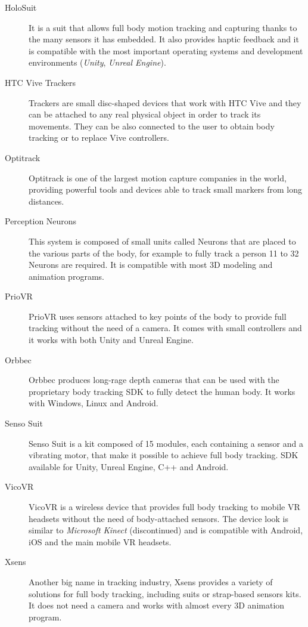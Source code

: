 \documentclass[binding=0.6cm,LaM]{sapthesis}
\begin{document}
\begin{description}

\item[HoloSuit]
It is a suit that allows full body motion tracking and capturing thanks to the many sensors it has embedded. It also provides haptic feedback and it is compatible with the most important operating systems and development environments (\textit{Unity}, \textit{Unreal Engine}).

\item[HTC Vive Trackers]
Trackers are small disc-shaped devices that work with HTC Vive and they can be attached to any real physical object in order to track its movements. They can be also connected to the user to obtain body tracking or to replace Vive controllers.

\item[Optitrack]
Optitrack is one of the largest motion capture companies in the world, providing powerful tools and devices able to track small markers from long distances.

\item[Perception Neurons]
This system is composed of small units called Neurons that are placed to the various parts of the body, for example to fully track a person 11 to 32 Neurons are required. It is compatible with most 3D modeling and animation programs.

\item[PrioVR]
PrioVR uses sensors attached to key points of the body to provide full tracking without the need of a camera. It comes with small controllers and it works with both Unity and Unreal Engine.

\item[Orbbec]
Orbbec produces long-rage depth cameras that can be used with the proprietary body tracking SDK to fully detect the human body. It works with Windows, Linux and Android.

\item[Senso Suit]
Senso Suit is a kit composed of 15 modules, each containing a sensor and a vibrating motor, that make it possible to achieve full body tracking.  SDK available for Unity, Unreal Engine, C++ and Android. 

\item[VicoVR]
VicoVR is a wireless device that provides full body tracking to mobile VR headsets without the need of body-attached sensors. The device look is similar to \textit{Microsoft Kinect} (discontinued) and is compatible with Android, iOS and the main mobile VR headsets.

\item[Xsens]
Another big name in tracking industry, Xsens provides a variety of solutions for full body tracking, including suits or strap-based sensors kits. It does not need a camera and works with almost every 3D animation program.

\end{description}
\end{document}

